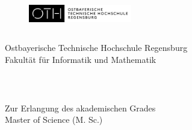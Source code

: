 \thispagestyle{empty}

\begin{figure}[t]
 \centering
 \includegraphics[width=0.4\textwidth]{assets/oth/logo}
\end{figure}

\begin{verbatim}
\end{verbatim}

\begin{center}
    \Large{Ostbayerische Technische Hochschule Regensburg} \\
    \Large{Fakultät für Informatik und Mathematik}
\end{center}

\begin{verbatim}
\end{verbatim}

\begin{center}
    \doublespacing
    \textbf{\huge{\titleDocument}}\\

    \onehalfspacing

    \begin{center}
        Zur Erlangung des akademischen Grades \\ Master of Science (M. Sc.)
    \end{center}

    \begin{verbatim}
    \end{verbatim}

    \begin{doublespace}
        \textbf{\Large{{~\subjectDocument}}}
    \end{doublespace}
\end{center}

\begin{verbatim}
\end{verbatim}

\begin{verbatim}
\end{verbatim}

